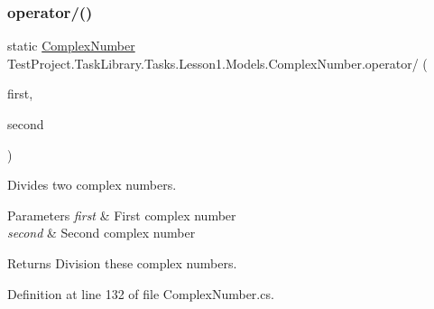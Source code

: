 \subsubsection{\texorpdfstring{operator/()}{operator/()}}
{\footnotesize\ttfamily static \mbox{\hyperlink{class_test_project_1_1_task_library_1_1_tasks_1_1_lesson1_1_1_models_1_1_complex_number}{Complex\+Number}} Test\+Project.\+Task\+Library.\+Tasks.\+Lesson1.\+Models.\+Complex\+Number.\+operator/ (\begin{DoxyParamCaption}\item[{\mbox{\hyperlink{class_test_project_1_1_task_library_1_1_tasks_1_1_lesson1_1_1_models_1_1_complex_number}{Complex\+Number}}}]{first,  }\item[{\mbox{\hyperlink{class_test_project_1_1_task_library_1_1_tasks_1_1_lesson1_1_1_models_1_1_complex_number}{Complex\+Number}}}]{second }\end{DoxyParamCaption})\hspace{0.3cm}{\ttfamily [static]}}



Divides two complex numbers. 


\begin{DoxyParams}{Parameters}
{\em first} & First complex number\\
\hline
{\em second} & Second complex number\\
\hline
\end{DoxyParams}
\begin{DoxyReturn}{Returns}
Division these complex numbers.
\end{DoxyReturn}


Definition at line 132 of file Complex\+Number.\+cs.

\mbox{\label{class_test_project_1_1_task_library_1_1_tasks_1_1_lesson1_1_1_models_1_1_complex_number_ab694005aab64bc920845b1c530b389fa}} 
